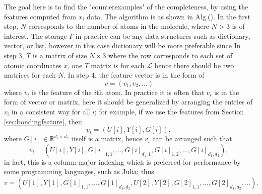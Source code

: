 \documentclass[12pt]{article}
\begin{document}
The goal here is to find the "counterexamples" of the completeness, by using the features computed from $x_i$ data. 
The algorithm is as shown in Alg.(). 
In the first step, $N$ corresponds to the number of atoms in the molecule, where $N > 3$ is of interest.
The storage $\Gamma$ in practice can be any data structures such as dictionary, vector, or list, however in this case dictionary will be more preferable since 
In step 3, $T$ is a matrix of size $N \times 3$ where the row corresponds to each set of atomic coordinates $x$, one $T$ matrix is for each $\mathcal{L}$ hence there should be two matrices for each $N$.
In step 4, the feature vector is in the form of 
\begin{equation*}
    v = (v_1, v_2, ...)
\end{equation*}
where $v_i$ is the feature of the $i$th atom. In practice it is often that $v_i$ is in the form of vector or matrix, here it should be generalized by arranging the entries of $v_i$ in a consistent way for all $i$;
for example, if we use the features from Section \ref{sec:bondingfeature}, then
\begin{equation*}
    v_i = (U[i], Y[i], G[i]),
\end{equation*}
where $G[i] \in \mathbb{R}^{d_1 \times d_2}$ itself is a matrix, hence $v_i$ can be arranged such that
\begin{equation*}
    v_i = (U[i], Y[i], G[i]_{1,1},..., G[i]_{d_1,1}, G[i]_{1,2},...,  G[i]_{d_1,d_2}),
\end{equation*}
in fact, this is a column-major indexing which is preferred for performance by some programming languages, such as Julia;
thus
\begin{equation*}
    v = (U[1], Y[1], G[1]_{1,1},..., G[1]_{d_1,d_2}, U[2], Y[2], G[2]_{1,1},..., G[2]_{d_1,d_2}, ...).
\end{equation*}
\end{document}
